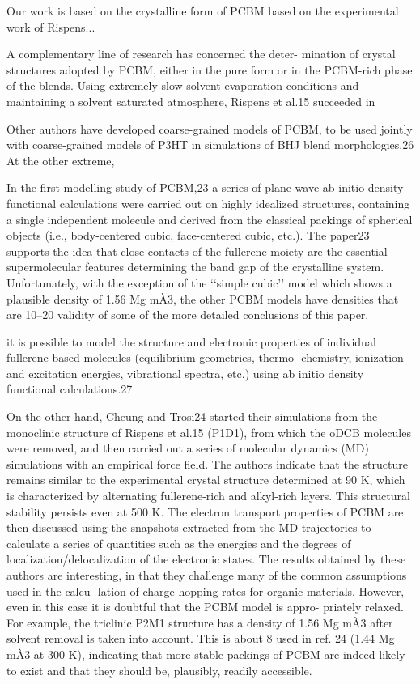 \documentclass[aps,prb,onecolumn,preprint,superscriptaddress,footinbib,amsmath,amssymb,floatfix]{revtex4}
\begin{document}
Our work is based on the crystalline form of PCBM based on 
the experimental work of Rispens...

A complementary line of research has concerned the deter-
mination of crystal structures adopted by PCBM, either in the
pure form or in the PCBM-rich phase of the blends. Using
extremely slow solvent evaporation conditions and maintaining
a solvent saturated atmosphere, Rispens et al.15 succeeded in

Other
authors have developed coarse-grained models of PCBM, to be
used jointly with coarse-grained models of P3HT in simulations
of BHJ blend morphologies.26 At the other extreme, 



In the first modelling study of PCBM,23 a series of plane-wave
ab initio density functional calculations were carried out on
highly idealized structures, containing a single independent
molecule and derived from the classical packings of spherical
objects (i.e., body-centered cubic, face-centered cubic, etc.). The
paper23 supports the idea that close contacts of the fullerene
moiety are the essential supermolecular features determining the
band gap of the crystalline system. Unfortunately, with the
exception of the ‘‘simple cubic’’ model which shows a plausible
density of 1.56 Mg mÀ3, the other PCBM models have densities
that are 10–20%
validity of some of the more detailed conclusions of this paper.

it is possible
to model the structure and electronic properties of individual
fullerene-based molecules (equilibrium geometries, thermo-
chemistry, ionization and excitation energies, vibrational
spectra, etc.) using ab initio density functional calculations.27


On the other hand, Cheung and Trosi24 started their simulations
from the monoclinic structure of Rispens et al.15 (P1D1), from
which the oDCB molecules were removed, and then carried out
a series of molecular dynamics (MD) simulations with an
empirical force field. The authors indicate that the structure
remains similar to the experimental crystal structure determined
at 90 K, which is characterized by alternating fullerene-rich and
alkyl-rich layers. This structural stability persists even at 500 K.
The electron transport properties of PCBM are then discussed
using the snapshots extracted from the MD trajectories to
calculate a series of quantities such as the energies and the
degrees of localization/delocalization of the electronic states. The
results obtained by these authors are interesting, in that they
challenge many of the common assumptions used in the calcu-
lation of charge hopping rates for organic materials. However,
even in this case it is doubtful that the PCBM model is appro-
priately relaxed. For example, the triclinic P2M1 structure has
a density of 1.56 Mg mÀ3 after solvent removal is taken into
account. This is about 8%
used in ref. 24 (1.44 Mg mÀ3 at 300 K), indicating that more
stable packings of PCBM are indeed likely to exist and that they
should be, plausibly, readily accessible.
\end{document}
